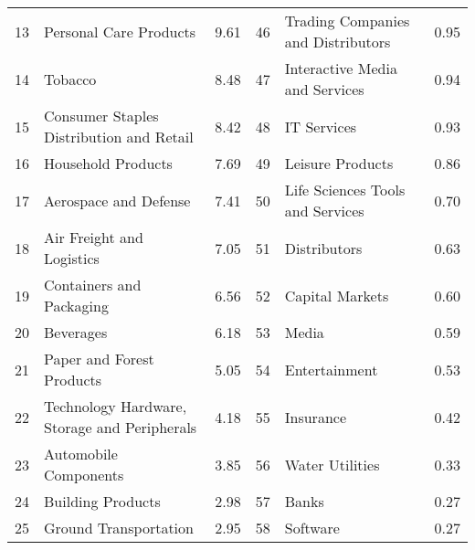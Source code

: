 \begin{tabular}{rlrrlr}
   13 &                             Personal Care Products &                9.61 &    46 &               Trading Companies and Distributors &                0.95 \\
   14 &                                            Tobacco &                8.48 &    47 &                   Interactive Media and Services &                0.94 \\
   15 &           Consumer Staples Distribution and Retail &                8.42 &    48 &                                      IT Services &                0.93 \\
   16 &                                 Household Products &                7.69 &    49 &                                 Leisure Products &                0.86 \\
   17 &                              Aerospace and Defense &                7.41 &    50 &                 Life Sciences Tools and Services &                0.70 \\
   18 &                          Air Freight and Logistics &                7.05 &    51 &                                     Distributors &                0.63 \\
   19 &                           Containers and Packaging &                6.56 &    52 &                                  Capital Markets &                0.60 \\
   20 &                                          Beverages &                6.18 &    53 &                                            Media &                0.59 \\
   21 &                          Paper and Forest Products &                5.05 &    54 &                                    Entertainment &                0.53 \\
   22 &       Technology Hardware, Storage and Peripherals &                4.18 &    55 &                                        Insurance &                0.42 \\
   23 &                              Automobile Components &                3.85 &    56 &                                  Water Utilities &                0.33 \\
   24 &                                  Building Products &                2.98 &    57 &                                            Banks &                0.27 \\
   25 &                              Ground Transportation &                2.95 &    58 &                                         Software &                0.27 \\

\end{tabular}
